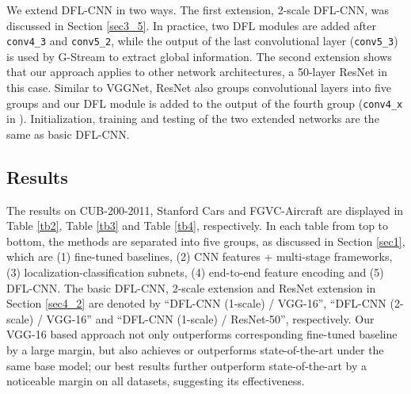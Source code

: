 \documentclass[10pt,twocolumn,letterpaper]{article}
\begin{document}
We extend DFL-CNN in two ways. The first extension, 2-scale DFL-CNN, was discussed in Section \ref{sec3_5}. In
practice, two DFL modules are added after \texttt{conv4\_3} and \texttt{conv5\_2}, while the output of the last
convolutional layer (\texttt{conv5\_3}) is used by G-Stream to extract global information. The second extension
shows that our approach applies to other network architectures, a 50-layer
ResNet \cite{resnet} in this case. Similar to VGGNet, ResNet also groups convolutional layers into five groups and our DFL
module is added to the output of the fourth group (\ie \texttt{conv4\_x} in \cite{resnet}). Initialization,
training and testing of the two extended networks are the same as basic DFL-CNN.

\subsection{Results} \label{sec4_3}
The results on CUB-200-2011, Stanford Cars and FGVC-Aircraft are displayed in Table \ref{tb2}, Table \ref{tb3} and Table
\ref{tb4}, respectively. In each table from top to bottom, the methods are separated into five groups, as discussed in Section \ref{sec1},
which are (1) fine-tuned
baselines, (2) CNN features + multi-stage frameworks, (3) localization-classification subnets,
(4) end-to-end feature encoding and (5) DFL-CNN. The basic DFL-CNN, 2-scale extension and ResNet extension in
Section \ref{sec4_2} are denoted by ``DFL-CNN (1-scale) / VGG-16'', ``DFL-CNN (2-scale) / VGG-16'' and ``DFL-CNN
(1-scale) / ResNet-50'', respectively. Our VGG-16 based approach not only outperforms corresponding fine-tuned baseline by
a large margin, but also achieves or outperforms state-of-the-art under the same base model; our best results further
outperform state-of-the-art by a noticeable margin on all datasets, suggesting its effectiveness.
\end{document}
